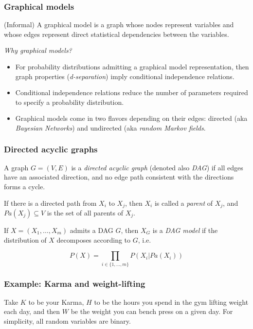 \begin{frame}
\frametitle{Graphical models}
\begin{definition}
(Informal) A graphical model is a graph whose nodes represent variables and whose edges represent direct statistical dependencies between the variables.\newline
\end{definition}

\emph{Why graphical models?}
\begin{itemize}
\item For probability distributions admitting a graphical model representation, then graph properties (\emph{d-separation}) imply conditional independence relations.
\item Conditional independence relations reduce the number of parameters required to specify a probability distribution.
\item Graphical models come in two flavors depending on their edges: directed (aka \emph{Bayesian Networks}) and undirected (aka \emph{random Markov fields}.
\end{itemize}
\end{frame}


\begin{frame}
\frametitle{Directed acyclic graphs}

\begin{definition}
A graph $G = (V, E)$ is a \emph{directed acyclic graph} (denoted also \emph{DAG}) if all edges have an associated direction, and no edge path consistent with the directions forms a cycle.\newline

If there is a directed path from $X_i$ to $X_j$, then $X_i$ is called a \emph{parent} of $X_j$, and $Pa(X_j) \subseteq V$ is the set of all parents of $X_j$.
\end{definition}

\begin{definition}
  If $X = (X_1, \ldots, X_m)$ admits a DAG $G$, then $X_G$ is a \emph{DAG model} if the distribution of $X$ decomposes according to $G$, i.e.

  \begin{equation*}
    P(X) = \prod_{i \in \{1, \ldots, m\}} P(X_i | Pa(X_i))
  \end{equation*}
\end{definition}
\end{frame}


\begin{frame}
  \frametitle{Example: Karma and weight-lifting}
  Take $K$ to be your Karma, $H$ to be the hours you spend in the gym lifting weight each day, and then $W$ be the weight you can bench press on a given day. For simplicity, all random variables are binary.\newline
  
  \newline
  \end{frame}


